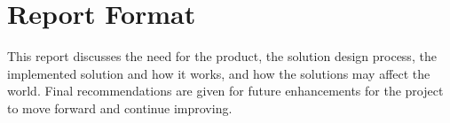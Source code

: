 \section{Report Format}
This report discusses the need for the product, the solution design process, the implemented solution and how it works, and how the solutions may affect the world.
Final recommendations are given for future enhancements for the project to move forward and continue improving.
